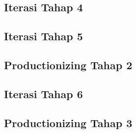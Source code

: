   \subsection{Iterasi Tahap 4}
  \subsection{Iterasi Tahap 5}
  \subsection{Productionizing Tahap 2}
  \subsection{Iterasi Tahap 6}
  \subsection{Productionizing Tahap 3}
  
\begin{comment}

\end{comment}
